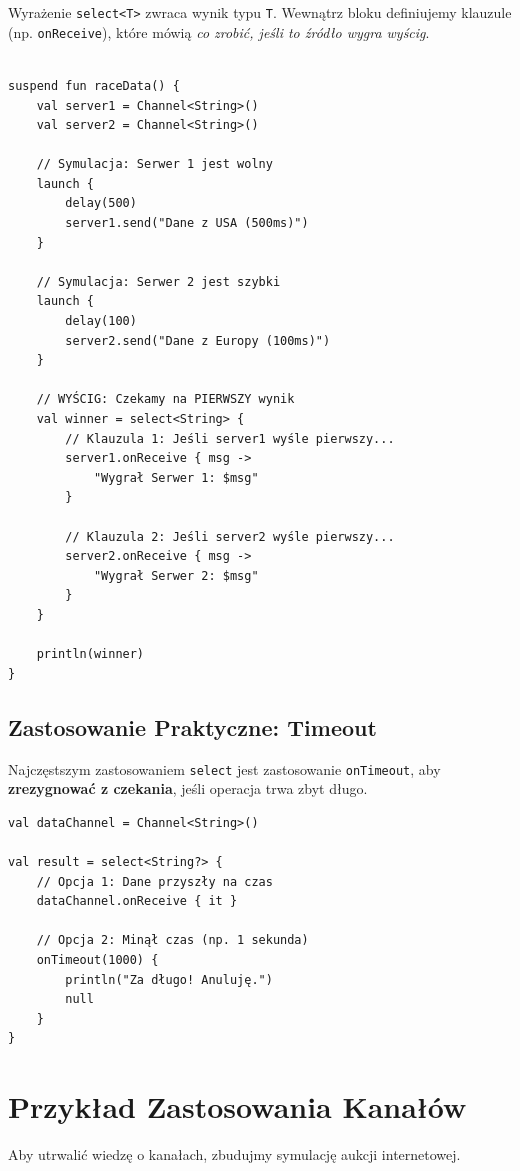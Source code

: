 Wyrażenie \texttt{select<T>} zwraca wynik typu \texttt{T}. Wewnątrz bloku definiujemy klauzule (np. \texttt{onReceive}), które mówią \textit{co zrobić, jeśli to źródło wygra wyścig}.

\begin{verbatim}

suspend fun raceData() {
    val server1 = Channel<String>()
    val server2 = Channel<String>()

    // Symulacja: Serwer 1 jest wolny
    launch {
        delay(500)
        server1.send("Dane z USA (500ms)")
    }

    // Symulacja: Serwer 2 jest szybki
    launch {
        delay(100)
        server2.send("Dane z Europy (100ms)")
    }

    // WYŚCIG: Czekamy na PIERWSZY wynik
    val winner = select<String> {
        // Klauzula 1: Jeśli server1 wyśle pierwszy...
        server1.onReceive { msg ->
            "Wygrał Serwer 1: $msg"
        }
        
        // Klauzula 2: Jeśli server2 wyśle pierwszy...
        server2.onReceive { msg ->
            "Wygrał Serwer 2: $msg"
        }
    }

    println(winner)
}
\end{verbatim}

\subsection{Zastosowanie Praktyczne: Timeout}

Najczęstszym zastosowaniem \texttt{select} jest zastosowanie \texttt{onTimeout}, aby \textbf{zrezygnować z czekania}, jeśli operacja trwa zbyt długo.

\begin{verbatim}
val dataChannel = Channel<String>()

val result = select<String?> {
    // Opcja 1: Dane przyszły na czas
    dataChannel.onReceive { it }
    
    // Opcja 2: Minął czas (np. 1 sekunda)
    onTimeout(1000) { 
        println("Za długo! Anuluję.")
        null 
    }
}
\end{verbatim}

\section{Przykład Zastosowania Kanałów}

Aby utrwalić wiedzę o kanałach, zbudujmy symulację aukcji internetowej.

